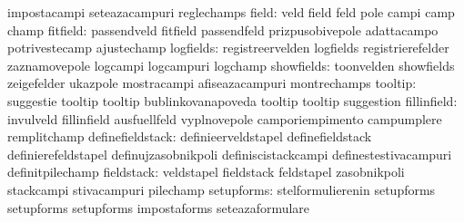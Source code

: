                                   impostacampi                     seteazacampuri
                                  reglechamps
                           field: veld                             field
                                  feld                             pole
                                  campi                            camp
                                  champ
                        fitfield: passendveld                      fitfield
                                  passendfeld                      prizpusobivepole %
                                  adattacampo                      potrivestecamp
                                  ajustechamp
                       logfields: registreervelden                 logfields
                                  registrierefelder                zaznamovepole
                                  logcampi                         logcampuri
                                  logchamp
                      showfields: toonvelden                       showfields
                                  zeigefelder                      ukazpole
                                  mostracampi                      afiseazacampuri
                                  montrechamps
                         tooltip: suggestie                        tooltip
                                  tooltip                          bublinkovanapoveda
                                  tooltip                          tooltip
                                  suggestion
                     fillinfield: invulveld                        fillinfield
                                  ausfuellfeld                     vyplnovepole
                                  camporiempimento                 campumplere
                                  remplitchamp
                definefieldstack: definieerveldstapel              definefieldstack
                                  definierefeldstapel              definujzasobnikpoli
                                  definiscistackcampi              definestestivacampuri
                                  definitpilechamp
                      fieldstack: veldstapel                       fieldstack
                                  feldstapel                       zasobnikpoli
                                  stackcampi                       stivacampuri
                                  pilechamp
                      setupforms: stelformulierenin                setupforms
                                  setupforms                       setupforms
                                  impostaforms                     seteazaformulare
